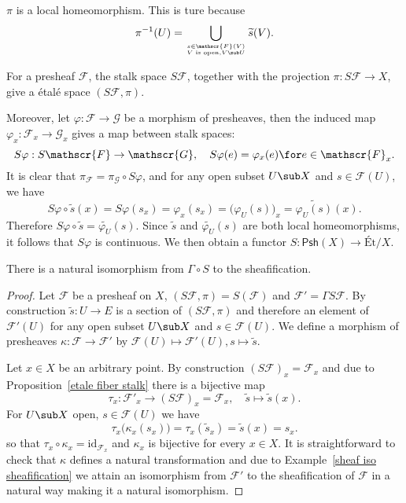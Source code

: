 $\pi$ is a local homeomorphism. This is ture because
\[\pi^{-1}(U)=\bigcup_{s\in\mathscr{F}(V)\atop\text{$V$ is open},V\sub U}\widetilde{s}(V).\]
\begin{proposition}
For a presheaf $\mathscr{F}$, the stalk space $S\mathscr{F}$, together with the projection $\pi:S\mathscr{F}\to X$, give a \'etal\'e space $(S\mathscr{F},\pi)$.
\end{proposition}
Moreover, let $\varphi:\mathscr{F}\to\mathscr{G}$ be a morphism of presheaves, then the induced map $\varphi_x:\mathscr{F}_x\to\mathscr{G}_x$ gives a map between stalk spaces:
\[S\varphi:S\mathscr{F}\to\mathscr{G},\quad S\varphi(e)=\varphi_x(e)\for e\in\mathscr{F}_x.\]
It is clear that $\pi_{\mathscr{F}}=\pi_{\mathscr{G}}\circ S\varphi$, and for any open subset $U\sub X$ and $s\in\mathscr{F}(U)$, we have
\[S\varphi\circ\widetilde{s}(x)=S\varphi(s_x)=\varphi_x(s_x)=\big(\varphi_U(s)\big)_x=\widetilde{\varphi_U(s)}(x).\]
Therefore $S\varphi\circ\widetilde{s}=\widetilde{\varphi_U}(s)$. Since $\widetilde{s}$ and $\widetilde{\varphi_U}(s)$ are both local homeomorphisms, it follows that $S\varphi$ is continuous. We then obtain a functor $S:\mathsf{Psh}(X)\to\text{\'Et/}X$.
\begin{theorem}\label{stalk section iso sheafification}
There is a natural isomorphism from $\Gamma\circ S$ to the sheafification.
\end{theorem}
\begin{proof}
Let $\mathscr{F}$ be a presheaf on $X$, $(S\mathscr{F},\pi)=S(\mathscr{F})$ and $\mathscr{F}'=\Gamma S\mathscr{F}$. By construction $\widetilde{s}:U\to E$ is a section of $(S\mathscr{F},\pi)$ and therefore an element of $\mathscr{F}'(U)$ for any open subset $U\sub X$ and $s\in\mathscr{F}(U)$. We define a morphism of presheaves $\kappa:\mathscr{F}\to\mathscr{F}'$ by $\mathscr{F}(U)\mapsto\mathscr{F}'(U),s\mapsto\widetilde{s}$.\par
Let $x\in X$ be an arbitrary point. By construction $(S\mathscr{F})_x=\mathscr{F}_x$ and due to Proposition~\ref{etale fiber stalk} there is a bijective map 
\[\tau_x:\mathscr{F}'_x\to(S\mathscr{F})_x=\mathscr{F}_x,\quad \widetilde{s}\mapsto\widetilde{s}(x).\]
For $U\sub X$ open, $s\in\mathscr{F}(U)$ we have
\[\tau_x\big(\kappa_x(s_x)\big)=\tau_x(\widetilde{s}_x)=\widetilde{s}(x)=s_x.\]
so that $\tau_x\circ\kappa_x=\mathrm{id}_{\mathscr{F}_x}$ and $\kappa_x$ is bijective for every $x\in X$. It is straightforward to check that $\kappa$ defines a natural transformation and due to Example~\ref{sheaf iso sheafification} we attain an isomorphism from $\mathscr{F}'$ to the sheafification of $\mathscr{F}$ in a natural way making it a natural isomorphism.
\end{proof}

